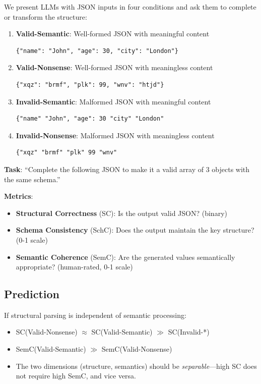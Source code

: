 \documentclass[11pt,a4paper]{article}
\begin{document}
We present LLMs with JSON inputs in four conditions and ask them to complete or transform the structure:

\begin{enumerate}
    \item \textbf{Valid-Semantic}: Well-formed JSON with meaningful content
    \begin{lstlisting}
{"name": "John", "age": 30, "city": "London"}
    \end{lstlisting}

    \item \textbf{Valid-Nonsense}: Well-formed JSON with meaningless content
    \begin{lstlisting}
{"xqz": "brmf", "plk": 99, "wnv": "htjd"}
    \end{lstlisting}

    \item \textbf{Invalid-Semantic}: Malformed JSON with meaningful content
    \begin{lstlisting}
{"name" "John", "age": 30 "city" "London"
    \end{lstlisting}

    \item \textbf{Invalid-Nonsense}: Malformed JSON with meaningless content
    \begin{lstlisting}
{"xqz" "brmf" "plk" 99 "wnv"
    \end{lstlisting}
\end{enumerate}

\textbf{Task}: ``Complete the following JSON to make it a valid array of 3 objects with the same schema.''

\textbf{Metrics}:
\begin{itemize}
    \item \textbf{Structural Correctness} (SC): Is the output valid JSON? (binary)
    \item \textbf{Schema Consistency} (SchC): Does the output maintain the key structure? (0-1 scale)
    \item \textbf{Semantic Coherence} (SemC): Are the generated values semantically appropriate? (human-rated, 0-1 scale)
\end{itemize}

\subsection{Prediction}

If structural parsing is independent of semantic processing:
\begin{itemize}
    \item SC(Valid-Nonsense) $\approx$ SC(Valid-Semantic) $\gg$ SC(Invalid-*)
    \item SemC(Valid-Semantic) $\gg$ SemC(Valid-Nonsense)
    \item The two dimensions (structure, semantics) should be \textit{separable}---high SC does not require high SemC, and vice versa.
\end{itemize}
\end{document}
